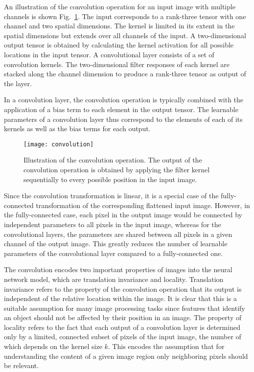 An illustration of the convolution operation for an input image with multiple
channels is shown Fig.~\ref{fig:machine_learning:convoluation}. The input
corresponds to a rank-three tensor with one channel and two spatial dimensions.
The kernel is limited in its extent in the spatial dimensions but extends over
all channels of the input. A two-dimensional output tensor is obtained by
calculating the kernel activation for all possible locations in the input
tensor. A convolutional layer consists of a set of convolution
kernels. The two-dimensional filter responses of each kernel are stacked along
the channel dimension to produce a rank-three tensor as output of the layer.

In a convolution layer, the convolution operation is typically combined with
the application of a bias term to each element in the output tensor. The learnable
parameters of a convolution layer thus correspond to the elements of each of its
kernels as well as the bias terms for each output.

\begin{figure}
  \centering
  \texttt{[image: convolution]}
  \caption{
    Illustration of the convolution operation. The output of the convolution
    operation is obtained by applying the filter kernel sequentially to every
    possible position in the input image.
  }
  \label{fig:machine_learning:convoluation}
\end{figure}

Since the convolution transformation is linear, it is a special case of the
fully-connected transformation of the corresponding flattened input image.
However, in the fully-connected case, each pixel in the output image would be
connected by independent parameters to all pixels in the input image, whereas
for the convolutional layers, the parameters are shared between all pixels in a
given channel of the output image. This greatly reduces the number of learnable
parameters of the convolutional layer compared to a fully-connected one.

The convolution encodes two important properties of images into the neural
network model, which are translation invariance and locality. Translation
invariance refers to the property of the convolution operation that its output
is independent of the relative location within the image. It is clear that this
is a suitable assumption for many image processing tasks since features that
identify an object should not be affected by their position in an image. The
property of locality refers to the fact that each output of a convolution layer
is determined only by a limited, connected subset of pixels of the input image,
the number of which depends on the kernel size $k$. This encodes the assumption
that for understanding the content of a given image region only neighboring
pixels should be relevant.

